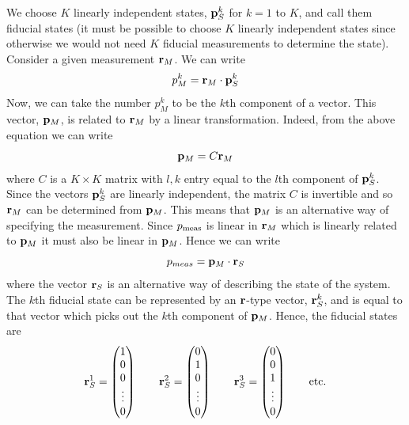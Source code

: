 \documentclass[12pt]{article}
\begin{document}
We choose $K$ linearly independent states, ${\bf p}^k_S$ for $k=1$
to $K$, and call them fiducial
states (it must be possible to choose $K$ linearly independent states
since otherwise we would not need $K$ fiducial measurements to determine
the state).  Consider a given measurement ${\bf r}_M$.  We can write
\begin{equation}
p_M^k = {\bf r}_M \cdot {\bf p}^k_S
\end{equation}
Now, we can take the number $p_M^k$ to be the $k$th component of a
vector.  This vector, ${\bf p}_M$, is related to ${\bf r}_M$ by a linear
transformation.  Indeed, from the above equation we can write
\begin{equation}\label{pCr}
{\bf p}_M = C {\bf r}_M
\end{equation}
where $C$ is a $K\times K$ matrix with $l,k$ entry equal to the $l$th
component of ${\bf p}_S^k$.  Since the vectors ${\bf p}_S^k$ are linearly
independent, the matrix $C$ is invertible and so ${\bf r}_M$
can be determined from ${\bf p}_M$. This means that ${\bf p}_M$ is an
alternative way of specifying the measurement.
Since $p_{\rm meas}$ is linear in
${\bf r}_M$ which is linearly related to ${\bf p}_M$ it must
also be linear in ${\bf p}_M$.  Hence we can write
\begin{equation}\label{formpr}
  p_{meas} = {\bf p}_M \cdot {\bf r}_S
  \end{equation}
where the vector  ${\bf r}_S$ is an alternative way of describing
the state of the system.  The $k$th fiducial state can be represented by an
${\bf r}$-type vector, ${\bf r}^k_S$, and is equal to that vector which
picks out the $k$th component of ${\bf p}_M$.  Hence, the fiducial
states are
\begin{equation}\label{fidS}
{\bf r}^1_S= \left(
\begin{matrix} 1 \\ 0 \\ 0 \\ \vdots \\ 0 \end{matrix} \right) \qquad
{\bf r}^2_S= \left(
\begin{matrix} 0 \\ 1 \\ 0 \\ \vdots \\ 0 \end{matrix} \right) \qquad
{\bf r}^3_S= \left(
\begin{matrix} 0 \\ 0 \\ 1 \\ \vdots \\ 0 \end{matrix} \right) \qquad
{\rm etc.}
\end{equation}
\end{document}
